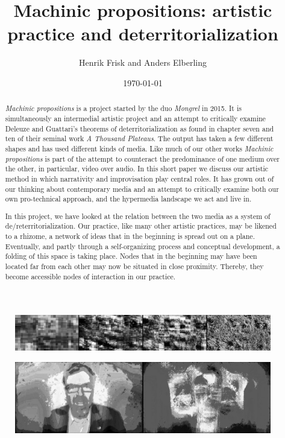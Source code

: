 \documentclass[11pt]{article}
\author{Henrik Frisk and Anders Elberling}
\date{\today}
\title{Machinic propositions: artistic practice and deterritorialization}
\begin{document}
\maketitle


\begin{abstract}
  \emph{Machinic propositions} is a project started by the duo \emph{Mongrel} in
2015. It is simultaneously an intermedial artistic project and an attempt to critically examine Deleuze and
Guattari's theorems of deterritorialization as found in chapter seven
and ten of their seminal work \emph{A Thousand Plateaus}. The output has taken a few different shapes and
has used different kinds of media. Like much of our other works \emph{Machinic propositions} is
part of the attempt to counteract the predominance of one medium over
the other, in particular, video over audio. In this short paper we
discuss our artistic method in which narrativity and improvisation play central
roles. It has grown out of our thinking about contemporary media and
an attempt to critically examine both our own pro-technical
approach, and the hypermedia landscape we act and live in.

In this project, we have looked at the
relation between the two media as a system of
de/reterritorialization. Our practice, like many other artistic
practices, may be likened to a rhizome, a network of ideas
that in the beginning is spread out on a plane. Eventually, and partly
through a self-organizing process and conceptual development, a folding of this space is taking place. Nodes that in the beginning may
have been located far from each other may now be situated in
close proximity. Thereby, they become accessible nodes of interaction
in our practice.

\end{abstract}
\begin{figure}\label{fig:impro-1}
  \centering
  \includegraphics[width=\linewidth]{img/final/Mongrel_weed_4pr_row_ELISK_monoC}
\end{figure}

\begin{figure}\label{fig:impro-1}
  \centering
  \includegraphics[width=\linewidth]{img/final/Mongrel_ansigLyd_2pr_row_ELISK_monoC_copy}
\end{figure}
\end{document}
